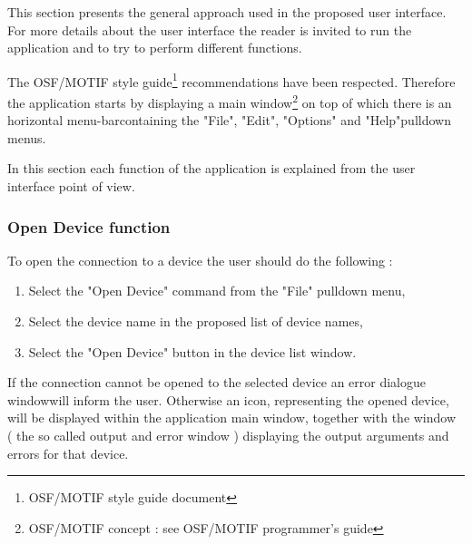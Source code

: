 %
%
%
%
%
%
%
%
%
%
This section presents the general approach used in the proposed user interface.
For more details about the user interface the reader is invited to run the
application and to try to perform different functions. 

The OSF/MOTIF style guide\footnote[1]{OSF/MOTIF style guide document}
recommendations have been respected. Therefore the application starts by
displaying a main window\footnote[2]{OSF/MOTIF concept : see OSF/MOTIF
programmer's guide} on top of which there is an horizontal
menu-bar\footnotemark[2] containing the "File", "Edit", "Options" and
"Help"\footnotemark[1] pulldown menus.

In this section each function of the application is explained from the user
interface point of view.

\subsubsection{Open Device function}

To open the connection to a device the user should do the following :
\begin{enumerate}
\item
Select the "Open Device" command from the "File" pulldown menu,
\item
Select the device name in the proposed list of device names,
\item
Select the "Open Device" button in the device list window.
\end{enumerate}

If the connection cannot be opened to the selected device an error dialogue
window\footnotemark[2] will inform the user. Otherwise an icon, representing the
opened device, will be displayed within the application main window, together
with the window ( the so called output and error window ) displaying the output
arguments and errors for that device.

